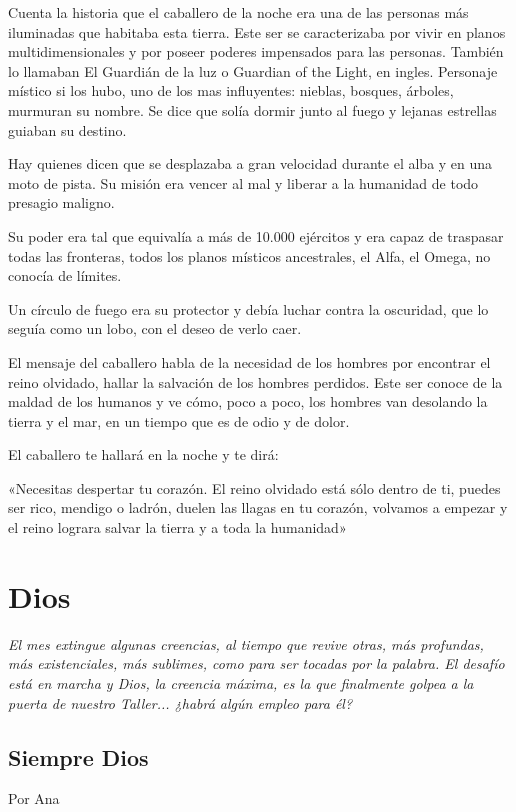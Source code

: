 \documentclass[11pt,twoside,openright,a5paper]{book}
\begin{document}
Cuenta la historia que el caballero de la noche era una de las personas más iluminadas que habitaba esta tierra. Este ser se caracterizaba por vivir en planos multidimensionales y por poseer poderes impensados para las personas. También  lo llamaban El Guardián de la luz o Guardian of the Light, en ingles. Personaje místico si los hubo, uno de los mas influyentes: nieblas, bosques, árboles, murmuran su nombre. Se dice que solía dormir junto al fuego y lejanas estrellas guiaban su destino.

Hay quienes dicen que se desplazaba a gran velocidad durante el alba y en una moto de pista.  Su misión era vencer al mal y liberar a la humanidad de todo presagio maligno. 

Su poder era tal que equivalía a más de 10.000 ejércitos y era capaz de  traspasar  todas las fronteras, todos los planos místicos ancestrales, el Alfa, el Omega, no conocía de límites.

Un círculo de fuego era su protector y debía luchar contra la oscuridad, que lo seguía como un lobo, con el deseo de verlo caer.

El mensaje del caballero habla de la necesidad de los hombres por encontrar el reino olvidado, hallar la salvación de los hombres perdidos. Este ser conoce de la maldad de los humanos y ve cómo, poco a poco, los hombres van desolando la tierra y el mar, en un tiempo que es de odio y de dolor.

El caballero te hallará en la noche y te dirá: 

«Necesitas despertar tu corazón. El reino olvidado está sólo dentro de ti, puedes ser rico, mendigo o ladrón, duelen las llagas en tu corazón, volvamos a empezar y el reino lograra salvar la tierra y a toda la humanidad»

\chapter*{Dios}

\vspace{0.5cm}
\emph{El mes extingue algunas creencias, al tiempo que revive otras, más profundas, más existenciales, más sublimes, como para ser tocadas por la palabra. El desafío está en marcha y Dios, la creencia máxima, es la que finalmente golpea a la puerta de nuestro Taller... ¿habrá algún empleo para él?}

\section*{Siempre Dios}
                                                                                                          \begin{flushright}Por Ana\end{flushright}
\end{document}
